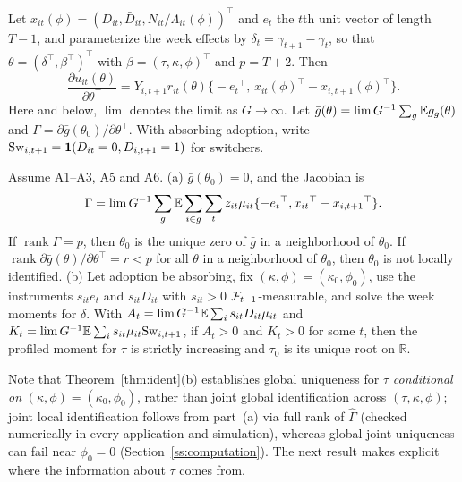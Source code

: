 Let $x_{it}(\phi)=(D_{it},\bar D_{it},N_{it}/\Lambda_{it}(\phi))^{\top}$ and $e_t$ the $t$th unit
vector of length $T-1$, and parameterize the week effects by $\delta_t=\gamma_{t+1}-\gamma_t$, so
that $\theta=(\delta^{\top},\beta^{\top})^{\top}$ with $\beta=(\tau,\kappa,\phi)^{\top}$ and
$p=T+2$. Then
\begin{equation}
\frac{\partial u_{it}(\theta)}{\partial\theta^{\top}}=Y_{i,t+1}r_{it}(\theta)\bigl\{-e_t{}^{\top},\,x_{it}(\phi)^{\top}-x_{i,t+1}(\phi)^{\top}\bigr\}.
\label{eq:jac}
\end{equation}
Here and below, $\lim$ denotes the limit as $G\to\infty$. Let $\bar g(\theta)=\lim G^{-1}\sum_g\mathbb{E} g_g(\theta)$ and $\Gamma=\partial\bar g(\theta_0)/\partial\theta^{\top}$.
With absorbing adoption, write $\mathrm{Sw}_{i,t+1}=\mathbf{1}(D_{it}=0,D_{i,t+1}=1)$ for switchers.

\begin{theorem}[Identification]
\label{thm:ident}
Assume A1--A3, A5 and A6.
(a) $\bar g(\theta_0)=0$, and the Jacobian is
\begin{equation*}
\Gamma=\lim G^{-1}\sum_g\mathbb{E}\sum_{i\in g}\sum_{t}z_{it}\mu_{it}\{-e_t{}^{\top},x_{it}{}^{\top}-x_{i,t+1}{}^{\top}\}.
\end{equation*}
If $\operatorname{rank}\Gamma=p$, then $\theta_0$ is the unique zero of $\bar g$ in a
neighborhood of $\theta_0$. If $\operatorname{rank}\partial\bar g(\theta)/\partial\theta^{\top}=r<p$
for all $\theta$ in a neighborhood of $\theta_0$, then $\theta_0$ is not locally identified.
(b) Let adoption be absorbing, fix $(\kappa,\phi)=(\kappa_0,\phi_0)$, use the instruments
$s_{it}e_t$ and $s_{it}D_{it}$ with $s_{it}>0$ $\mathcal{F}_{t-1}$-measurable, and solve the week moments
for $\delta$. With $A_t=\lim G^{-1}\mathbb{E}\sum_i s_{it}D_{it}\mu_{it}$ and
$K_t=\lim G^{-1}\mathbb{E}\sum_i s_{it}\mu_{it}\mathrm{Sw}_{i,t+1}$, if $A_t>0$ and $K_t>0$ for some $t$, then
the profiled moment for $\tau$ is strictly increasing and $\tau_0$ is its unique root on
$\mathbb R$.
\end{theorem}

Note that Theorem~\ref{thm:ident}(b) establishes global uniqueness for $\tau$ \emph{conditional on}
$(\kappa,\phi)=(\kappa_0,\phi_0)$, rather than joint global identification across $(\tau,\kappa,\phi)$;
joint local identification follows from part~(a) via full rank of $\hat\Gamma$ (checked numerically
in every application and simulation), whereas global joint uniqueness can fail near $\phi_0=0$
(Section~\ref{ss:computation}). The next result makes explicit where the information about $\tau$ comes from.

